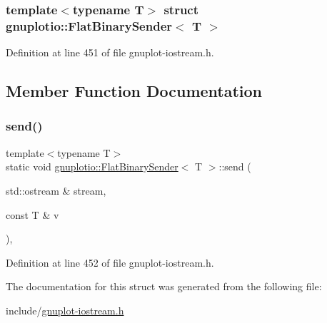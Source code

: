 \subsubsection*{template$<$typename T$>$\newline
struct gnuplotio\+::\+Flat\+Binary\+Sender$<$ T $>$}



Definition at line 451 of file gnuplot-\/iostream.\+h.



\subsection{Member Function Documentation}
\mbox{\label{structgnuplotio_1_1_flat_binary_sender_a24d085492f2539c14033cd5c6ba75ba5}} 
\subsubsection{\texorpdfstring{send()}{send()}}
{\footnotesize\ttfamily template$<$typename T$>$ \\
static void \hyperlink{structgnuplotio_1_1_flat_binary_sender}{gnuplotio\+::\+Flat\+Binary\+Sender}$<$ T $>$\+::send (\begin{DoxyParamCaption}\item[{std\+::ostream \&}]{stream,  }\item[{const T \&}]{v }\end{DoxyParamCaption})\hspace{0.3cm}{\ttfamily [inline]}, {\ttfamily [static]}}



Definition at line 452 of file gnuplot-\/iostream.\+h.



The documentation for this struct was generated from the following file\+:\begin{DoxyCompactItemize}
\item 
include/\hyperlink{gnuplot-iostream_8h}{gnuplot-\/iostream.\+h}\end{DoxyCompactItemize}
